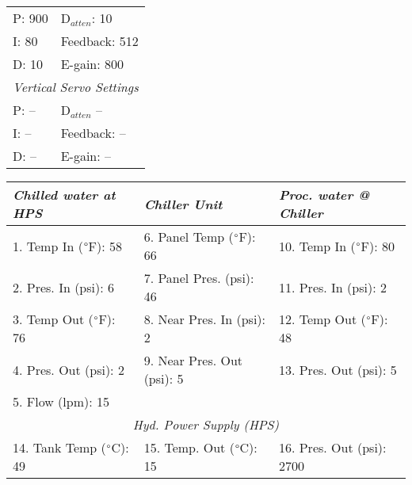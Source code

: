 \documentclass[letterpaper, 10pt]{article}
\begin{document}
\begin{table}[!ht]
        \footnotesize
        \renewcommand{\arraystretch}{1.1}
        \begin{tabular}{ p{1cm}|p{2cm} } \rowcolor[HTML]{EFEFEF}
            \multicolumn{2}{c}{\textit{Horizontal Servo Settings} \cellcolor[HTML]{EFEFEF}} \\ \hline P: 900 & D$_{atten}$: 10 \\ \hline
        I: 80 & Feedback: 512 \\ \hline 
        D: 10 & E-gain: 800 \\ \hline 
        \multicolumn{2}{c}{\textit{Vertical Servo Settings} \cellcolor[HTML]{EFEFEF}} \\ \hline 
        P: -- & D$_{atten}$  -- \\ \hline 
        I: -- & Feedback: -- \\ \hline
        D: -- & E-gain: -- \\ \hline 
    \end{tabular} \hfill 
        \renewcommand{\arraystretch}{1.1}
        \begin{tabular}{ l|l|l } \rowcolor[HTML]{EFEFEF}
        \textit{Chilled water at HPS} & \textit{Chiller Unit} & \textit{Proc. water @ Chiller} \\ \hline 1. Temp In ($\degree$F): 58 & 6. Panel Temp ($\degree$F): 66 & 10. Temp In ($\degree$F): 80 \\ \hline 
    2. Pres. In (psi): 6 & 7. Panel Pres. (psi): 46 & 11. Pres. In (psi): 2 \\ \hline 
    3. Temp Out ($\degree$F): 76 & 8. Near Pres. In (psi): 2& 12. Temp Out ($\degree$F): 48 \\ \hline 
    4. Pres. Out (psi): 2& 9. Near Pres. Out (psi): 5& 13. Pres. Out (psi): 5 \\ \hline 
    5. Flow (lpm): 15 \\ \hline 
    \multicolumn{3}{c}{\textit{Hyd. Power Supply (HPS)} \cellcolor[HTML]{EFEFEF}} \\ \hline 
    14. Tank Temp ($\degree$C): 49 & 15. Temp. Out ($\degree$C): 15 & 16. Pres. Out (psi): 2700 \\ \hline 
    \end{tabular} 
    \end{table} \vspace{-0.5cm} 
\end{document}
